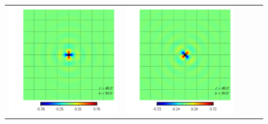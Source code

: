 \documentclass[a4paper,11pt]{article}
\begin{document}
\begin{figure}[!t]
\begin{center}
\begin{tabular}{m{8ex}m{}m{}|m{}m{}}
\hspace{\kernelfigspace}\includegraphics[width=\kernelfigwidth]{qu2ebqu_rker_I_lat90_lon45.pdf} &
\hspace{\kernelfigspace}\includegraphics[width=\kernelfigwidth]{qu2ebqu_iker_I_lat90_lon45.pdf} \\

\end{tabular}
\end{center}
\end{figure}
\end{document}
